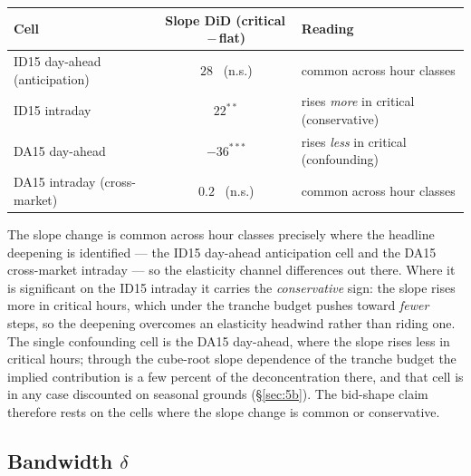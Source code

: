 \documentclass[11pt,a4paper]{article}
\theoremstyle{definition}
\theoremstyle{remark}
\theoremstyle{plain}
\begin{document}
\begin{center}
\footnotesize
\setlength{\tabcolsep}{8pt}
\begin{tabular}{l c l}
\toprule
\textbf{Cell} & \textbf{Slope DiD (critical\,$-$\,flat)} & \textbf{Reading} \\
\midrule
ID15 day-ahead (anticipation) & $28$ \ (n.s.)   & common across hour classes \\
ID15 intraday                 & $22^{**}$       & rises \emph{more} in critical (conservative) \\
DA15 day-ahead                & $-36^{***}$     & rises \emph{less} in critical (confounding) \\
DA15 intraday (cross-market)  & $0.2$ \ (n.s.)  & common across hour classes \\
\bottomrule
\end{tabular}
\label{tab:slope-confound}
\end{center}

The slope change is common across hour classes precisely where the headline deepening is identified --- the ID15 day-ahead anticipation cell and the DA15 cross-market intraday --- so the elasticity channel differences out there. Where it is significant on the ID15 intraday it carries the \emph{conservative} sign: the slope rises more in critical hours, which under the tranche budget pushes toward \emph{fewer} steps, so the deepening overcomes an elasticity headwind rather than riding one. The single confounding cell is the DA15 day-ahead, where the slope rises less in critical hours; through the cube-root slope dependence of the tranche budget the implied contribution is a few percent of the deconcentration there, and that cell is in any case discounted on seasonal grounds (\S\ref{sec:5b}). The bid-shape claim therefore rests on the cells where the slope change is common or conservative.

\subsection{Bandwidth $\delta$}\label{sec:5e}
\end{document}
